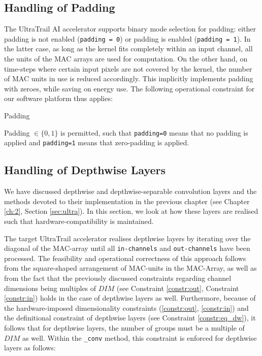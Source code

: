 \documentclass[11pt,a4paper, open=any]{scrbook}
\newcounter{constraint}[chapter]
\newenvironment{constraintbox}[2]{%
	\refstepcounter{constraint}%
	\begin{constraintboxbase}{#1}\label{constr:#2}%
	}{%
	\end{constraintboxbase}%
}
\newcommand{\py}[1]{\texttt{#1}}
\begin{document}
\subsection{Handling of Padding}
The UltraTrail AI accelerator supports binary mode selection for padding: either padding is not enabled (\texttt{padding = 0}) or padding is enabled (\texttt{padding = 1}). In the latter case, as long as the kernel fits completely within an input channel, all the units of the MAC arrays are used for computation. On the other hand, on time-steps where certain input pixels are not covered by the kernel, the number of MAC units in use is reduced accordingly. This implicitly implements padding with zeroes, while saving on energy use. The following operational constraint for our software platform thus applies:

\begin{constraintbox}{Padding}{pad}
	Padding $\in \{0, 1\}$ is permitted, such that \texttt{padding=0} means that no padding is applied and \texttt{padding=1} means that zero-padding is applied. 
\end{constraintbox}


\subsection{Handling of Depthwise Layers}
We have discussed depthwise and depthwise-separable convolution layers and the methods devoted to their implementation in the previous chapter (see Chapter \ref{ch:2}, Section \ref{sec:ultra}). In this section, we look at how these layers are realised such that hardware-compatibility is maintained.

The target UltraTrail accelerator realises depthwise layers by iterating over the diagonal of the MAC-array until all \texttt{in-channels} and \texttt{out-channels} have been processed. The feasibility and operational correctness of this approach follows from the square-shaped arrangement of MAC-units in the MAC-Array, as well as from the fact that the previously discussed constraints regarding channel dimensions being multiples of $DIM$ (see Constraint \ref{constr:out}, Constraint \ref{constr:in}) holds in the case of depthwise layers as well. Furthermore, because of the hardware-imposed dimensionality constraints (\ref{constr:out}, \ref{constr:in}) and the definitional constraint of depthwise layers (see Constraint \ref{constr:eq_dw}), it follows that for depthwise layers, the number of groups must be a multiple of $DIM$ as well. Within the \py{_conv} method, this constraint is enforced for depthwise layers as follows:
\end{document}
